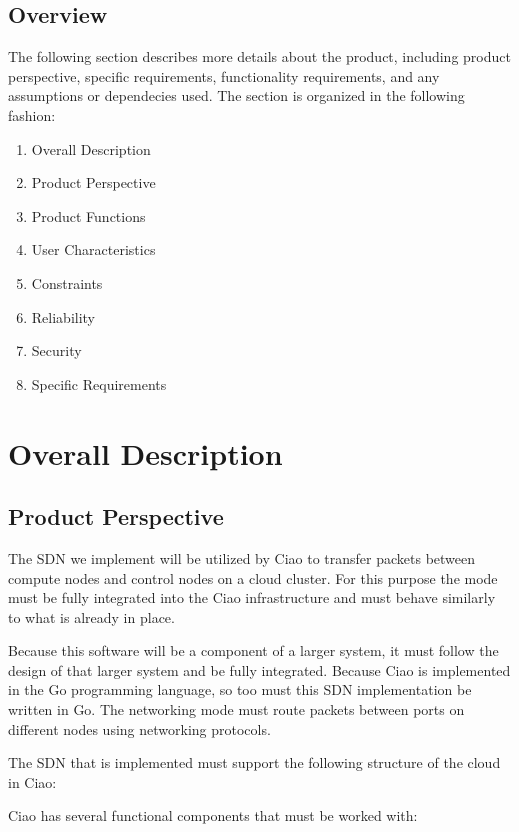 \documentclass[10pt,letterpaper,onecolumn,draftclsnofoot]{IEEEtran}
\begin{document}
\subsection{Overview}
The following section describes more details about the product, including 
product perspective, specific requirements, functionality requirements, and any
assumptions or dependecies used. The section is organized in the following
fashion:
\begin{enumerate}
	\item Overall Description
	\item Product Perspective
	\item Product Functions
	\item User Characteristics
	\item Constraints
	\item Reliability
	\item Security
	\item Specific Requirements
\end{enumerate}

\section{Overall Description}

\subsection{Product Perspective}

The SDN we implement will be utilized by Ciao to transfer packets between
compute nodes and control nodes on a cloud cluster. For this purpose the mode
must be fully integrated into the Ciao infrastructure and must behave similarly
to what is already in place.

Because this software will be a component of a larger system, it must follow the
design of that larger system and be fully integrated. Because Ciao is
implemented in the Go programming language, so too must this SDN implementation
be written in Go. The networking mode must route packets between ports on
different nodes using networking protocols.

The SDN that is implemented must support the following structure of the cloud in
Ciao:

\begin{center}
\end{center}

Ciao has several functional components that must be worked with:
\end{document}
